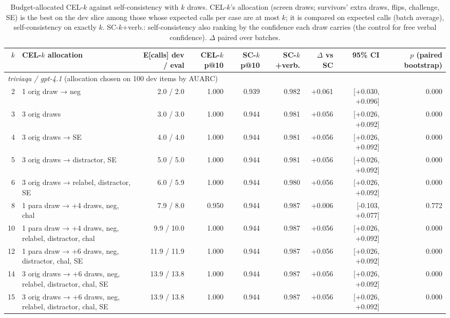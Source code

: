 \begin{table}[t]
\centering
\small
\begin{tabular}{rlrrrrrrr}
\toprule
$k$ & CEL-$k$ allocation & E[calls] dev / eval & CEL-$k$ p@10 & SC-$k$ p@10 & SC-$k$+verb. & $\Delta$ vs SC & 95\% CI & $p$ (paired bootstrap) \\
\midrule
\multicolumn{9}{l}{\emph{triviaqa / gpt-4.1} (allocation chosen on 100 dev items by AUARC)} \\
2 & 1 orig draw → neg & 2.0 / 2.0 & 1.000 & 0.939 & 0.982 & +0.061 & [+0.030, +0.096] & 0.000 \\
3 & 3 orig draws & 3.0 / 3.0 & 1.000 & 0.944 & 0.981 & +0.056 & [+0.026, +0.092] & 0.000 \\
4 & 3 orig draws → SE & 4.0 / 4.0 & 1.000 & 0.944 & 0.981 & +0.056 & [+0.026, +0.092] & 0.000 \\
5 & 3 orig draws → distractor, SE & 5.0 / 5.0 & 1.000 & 0.944 & 0.981 & +0.056 & [+0.026, +0.092] & 0.000 \\
6 & 3 orig draws → relabel, distractor, SE & 6.0 / 5.9 & 1.000 & 0.944 & 0.980 & +0.056 & [+0.026, +0.092] & 0.000 \\
8 & 1 para draw → +4 draws, neg, chal & 7.9 / 8.0 & 0.950 & 0.944 & 0.987 & +0.006 & [-0.103, +0.077] & 0.772 \\
10 & 1 para draw → +4 draws, neg, relabel, distractor, chal & 9.9 / 10.0 & 1.000 & 0.944 & 0.987 & +0.056 & [+0.026, +0.092] & 0.000 \\
12 & 1 para draw → +6 draws, neg, distractor, chal, SE & 11.9 / 11.9 & 1.000 & 0.944 & 0.987 & +0.056 & [+0.026, +0.092] & 0.000 \\
14 & 3 orig draws → +6 draws, neg, relabel, distractor, chal, SE & 13.9 / 13.8 & 1.000 & 0.944 & 0.987 & +0.056 & [+0.026, +0.092] & 0.000 \\
15 & 3 orig draws → +6 draws, neg, relabel, distractor, chal, SE & 13.9 / 13.8 & 1.000 & 0.944 & 0.987 & +0.056 & [+0.026, +0.092] & 0.000 \\
\bottomrule
\end{tabular}
\caption{Budget-allocated CEL-$k$ against self-consistency with $k$ draws. CEL-$k$'s allocation (screen draws; survivors' extra draws, flips, challenge, SE) is the best on the dev slice among those whose expected calls per case are at most $k$; it is compared on expected calls (batch average), self-consistency on exactly $k$. SC-$k$+verb.: self-consistency also ranking by the confidence each draw carries (the control for free verbal confidence). $\Delta$ paired over batches.}
\label{tab:budget_matched}
\end{table}
